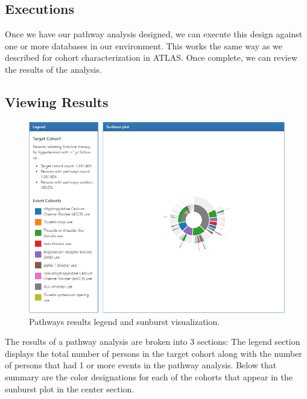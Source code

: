\documentclass[11pt]{book}
\theoremstyle{definition}
\theoremstyle{definition}
\theoremstyle{definition}
\theoremstyle{remark}
\begin{document}
\hypertarget{executions-1}{%
\subsection{Executions}\label{executions-1}}

Once we have our pathway analysis designed, we can execute this design against one or more databases in our environment. This works the same way as we described for cohort characterization in ATLAS. Once complete, we can review the results of the analysis.

\hypertarget{viewing-results}{%
\subsection{Viewing Results}\label{viewing-results}}

\begin{figure}

{\centering \includegraphics[width=1\linewidth]{images/Characterization/atlasPathwaysResults} 

}

\caption{Pathways results legend and sunburst visualization.}\label{fig:atlasPathwaysResults}
\end{figure}

The results of a pathway analysis are broken into 3 sections: The legend section displays the total number of persons in the target cohort along with the number of persons that had 1 or more events in the pathway analysis. Below that summary are the color designations for each of the cohorts that appear in the sunburst plot in the center section.
\end{document}
